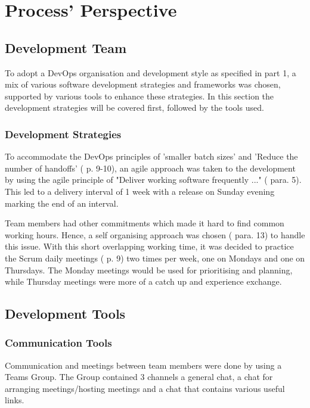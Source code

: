 \documentclass[report/main.tex]{subfiles}
\begin{document}
    \section{Process' Perspective}
    \label{Sec:process_perspective}
        \subsection{Development Team}
        \label{subsec:development-team}
            To adopt a DevOps organisation and development style as specified in \cite{devops-handbook} part 1, a mix of various software development strategies and frameworks was chosen, supported by various tools to enhance these strategies. In this section the development strategies will be covered first, followed by the tools used.
            
            \subsubsection{Development Strategies}
            \label{subsubsec:development-strategies}
                To accommodate the DevOps principles of 'smaller batch sizes' and 'Reduce the number of handoffs' (\cite{devops-handbook} p. 9-10), an agile approach was taken to the development by using the agile principle of "Deliver working software frequently ..." (\cite{agile-manifesto-second-page} para. 5). This led to a delivery interval of 1 week with a release on Sunday evening marking the end of an interval.
                
                Team members had other commitments which made it hard to find common working hours. Hence, a self organising approach was chosen (\cite{agile-manifesto-second-page} para. 13) to handle this issue. With this short overlapping working time, it was decided to practice the Scrum daily meetings (\cite{2020-scrum-guide} p. 9) two times per week, one on Mondays and one on Thursdays. The Monday meetings would be used for prioritising and planning, while Thursday meetings were more of a catch up and experience exchange.
        
        \subsection{Development Tools}
        \label{subsec:development-tools}
            \subsubsection{Communication Tools}
            \label{subsubsec:communication-tools}
                Communication and meetings between team members were done by using a Teams Group. The Group contained 3 channels a general chat, a chat for arranging meetings/hosting meetings and a chat that contains various useful links.
                
\end{document}
